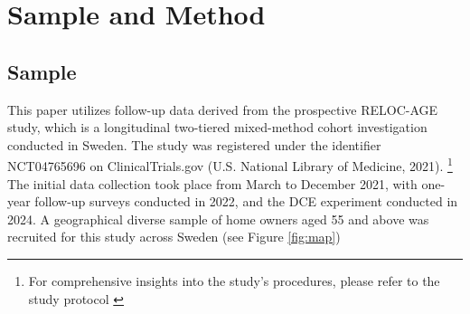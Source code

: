 \documentclass[3p,12pt ]{elsarticle}
\begin{document}
\section{Sample and Method}

\subsection{Sample}

This paper utilizes follow-up data derived from the prospective RELOC-AGE study,
which is a longitudinal two-tiered mixed-method cohort investigation conducted in Sweden.
The study was registered under the identifier NCT04765696 on ClinicalTrials.gov (U.S. National Library of Medicine, 2021).
\footnote{For comprehensive insights into the study's procedures,
please refer to the study protocol  \cite{zingmarkExploringAssociationsHousing2021}}
The initial data collection took place from March to December 2021, with one-year follow-up surveys conducted in 2022, and the DCE experiment conducted in 2024.
A geographical diverse sample of home owners aged 55 and above was recruited for this study across Sweden (see Figure \ref{fig:map})
\end{document}
